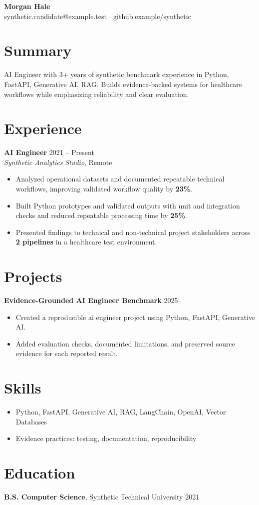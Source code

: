 \documentclass[10pt,letterpaper]{article}
\newcommand{\resumeItem}[1]{\item #1}
\newcommand{\resumeItemListStart}{\begin{itemize}[leftmargin=*]}
\newcommand{\resumeItemListEnd}{\end{itemize}}
\begin{document}
\begin{center}
{\Large \textbf{Morgan Hale}}\\
synthetic.candidate@example.test $\cdot$ github.example/synthetic
\end{center}

\section*{Summary}
AI Engineer with 3+ years of synthetic benchmark experience in Python, FastAPI, Generative AI, RAG. Builds evidence-backed systems for healthcare workflows while emphasizing reliability and clear evaluation.

\section*{Experience}
\textbf{AI Engineer} \hfill 2021 -- Present\\
\textit{Synthetic Analytics Studio}, Remote
\resumeItemListStart
  \resumeItem{Analyzed operational datasets and documented repeatable technical workflows, improving validated workflow quality by \textbf{23\%}.}
  \resumeItem{Built Python prototypes and validated outputs with unit and integration checks and reduced repeatable processing time by \textbf{25\%}.}
  \resumeItem{Presented findings to technical and non-technical project stakeholders across \textbf{2 pipelines} in a healthcare test environment.}
\resumeItemListEnd

\section*{Projects}
\textbf{Evidence-Grounded AI Engineer Benchmark} \hfill 2025
\resumeItemListStart
  \resumeItem{Created a reproducible ai engineer project using Python, FastAPI, Generative AI.}
  \resumeItem{Added evaluation checks, documented limitations, and preserved source evidence for each reported result.}
\resumeItemListEnd

\section*{Skills}
\resumeItemListStart
  \resumeItem{Python, FastAPI, Generative AI, RAG, LangChain, OpenAI, Vector Databases}
  \resumeItem{Evidence practices: testing, documentation, reproducibility}
\resumeItemListEnd

\section*{Education}
\textbf{B.S. Computer Science}, Synthetic Technical University \hfill 2021
\end{document}
